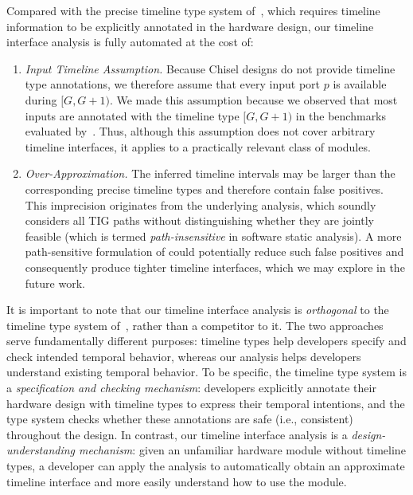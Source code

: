 Compared with the precise timeline type system of~\cite{nigam_modular_2023}, which requires timeline information to be explicitly annotated in the hardware design, our timeline interface analysis is fully automated at the cost of:
\begin{enumerate}[leftmargin=*]
    \item
    \emph{Input Timeline Assumption.}
    Because Chisel designs do not provide timeline type annotations, we therefore assume that every input port $p$ is available during $[G,G+1)$.
    We made this assumption because we observed that most inputs are annotated with the timeline type $[G,G+1)$ in the benchmarks evaluated by~\cite{nigam_modular_2023}.
    Thus, although this assumption does not cover arbitrary timeline interfaces, it applies to a practically relevant class of modules.
    \item
    \emph{Over-Approximation.}
    The inferred timeline intervals may be larger than the corresponding precise timeline types and therefore contain false positives.
    This imprecision originates from the underlying \tia analysis, which soundly considers all TIG paths without distinguishing whether they are jointly feasible (which is termed \emph{path-insensitive} in software static analysis).
    A more path-sensitive formulation of \tia could potentially reduce such false positives and consequently produce tighter timeline interfaces, which we may explore in the future work.
\end{enumerate}
It is important to note that our timeline interface analysis is \emph{orthogonal} to the timeline type system of~\cite{nigam_modular_2023}, rather than a competitor to it.
The two approaches serve fundamentally different purposes:
timeline types help developers specify and check intended temporal behavior, whereas our analysis helps developers understand existing temporal behavior.
To be specific, the timeline type system is a \emph{specification and checking mechanism}:
developers explicitly annotate their hardware design with timeline types to express their temporal intentions, and the type system checks whether these annotations are safe (i.e., consistent) throughout the design.
In contrast, our timeline interface analysis is a \emph{design-understanding mechanism}:
given an unfamiliar hardware module without timeline types, a developer can apply the analysis to automatically obtain an approximate timeline interface and more easily understand how to use the module.

